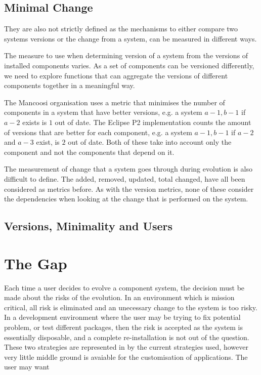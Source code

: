 \subsection{Minimal Change}
They are also not strictly defined as the mechanisms to either compare two systems versions or the change from a system,
can be measured in different ways.

The measure to use when determining version of a system from the versions of installed components varies.
As a set of components can be versioned differently, 
we need to explore functions that can aggregate the versions of different components together in a meaningful way.




The Mancoosi organisation uses a metric that minimises the number of components in a system that have better versions, 
e.g. a system $a-1,b-1$ if $a-2$ exists is $1$ out of date. 
The Eclipse P2 implementation counts the amount of versions that are better for each component,
e.g. a system $a-1,b-1$ if $a-2$ and $a-3$ exist, is $2$ out of date.
Both of these take into account only the component and not the components that depend on it.

The measurement of change that a system goes through during evolution is also difficult to define.
The added, removed, updated, total changed, have all been considered as metrics before. 
As with the version metrics, none of these consider the dependencies when looking at the change that is performed on the system.

\subsection{Versions, Minimality and Users}

\section{The Gap}
Each time a user decides to evolve a component system, the decision must be made about the risks of the evolution.
In an environment which is mission critical, all risk is eliminated and an unecessary change to the system is too risky.
In a development environment where the user may be trying to fix potential problem, 
or test different packages, then the risk is accepted as the system is essentially disposable, and a complete re-installation is not out of the question.
These two strategies are represented in by the current strategies used, however very little middle ground is avaiable for the customisation of applications.
The user may want 